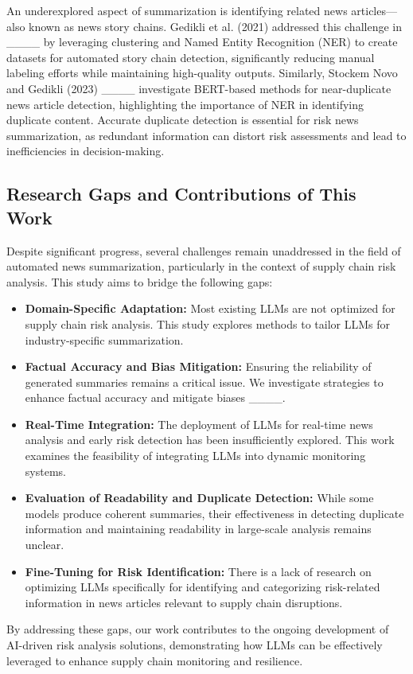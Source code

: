 An underexplored aspect of summarization is identifying related news articles—also known as news story chains. Gedikli et al. (2021) addressed this challenge in ____ by leveraging clustering and Named Entity Recognition (NER) to create datasets for automated story chain detection, significantly reducing manual labeling efforts while maintaining high-quality outputs. Similarly, Stockem Novo and Gedikli (2023) ____ investigate BERT-based methods for near-duplicate news article detection, highlighting the importance of NER in identifying duplicate content. Accurate duplicate detection is essential for risk news summarization, as redundant information can distort risk assessments and lead to inefficiencies in decision-making.

\subsection{Research Gaps and Contributions of This Work}

Despite significant progress, several challenges remain unaddressed in the field of automated news summarization, particularly in the context of supply chain risk analysis. This study aims to bridge the following gaps:

\begin{itemize}
  \item \textbf{Domain-Specific Adaptation:} Most existing LLMs are not optimized for supply chain risk analysis. This study explores methods to tailor LLMs for industry-specific summarization.
  \item \textbf{Factual Accuracy and Bias Mitigation:} Ensuring the reliability of generated summaries remains a critical issue. We investigate strategies to enhance factual accuracy and mitigate biases ____.
  \item \textbf{Real-Time Integration:} The deployment of LLMs for real-time news analysis and early risk detection has been insufficiently explored. This work examines the feasibility of integrating LLMs into dynamic monitoring systems.
  \item \textbf{Evaluation of Readability and Duplicate Detection:} While some models produce coherent summaries, their effectiveness in detecting duplicate information and maintaining readability in large-scale analysis remains unclear.
  \item \textbf{Fine-Tuning for Risk Identification:} There is a lack of research on optimizing LLMs specifically for identifying and categorizing risk-related information in news articles relevant to supply chain disruptions.
\end{itemize}

By addressing these gaps, our work contributes to the ongoing development of AI-driven risk analysis solutions, demonstrating how LLMs can be effectively leveraged to enhance supply chain monitoring and resilience.